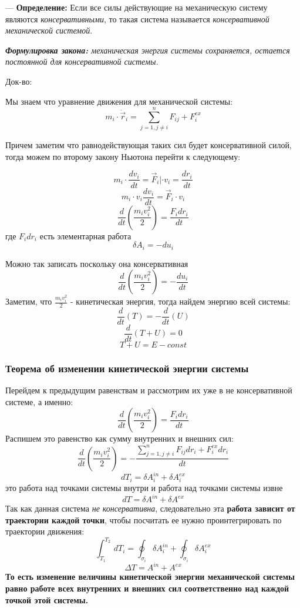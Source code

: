 \documentclass[12pt,a4paper]{report}
\begin{document}
\vspace{5px}

--- \textbf{Определение:} Если все силы действующие на механическую систему являются \textit{консервативными}, то такая система называется \textit{консервативной механической системой}.

\vspace{5px}

\textit{\textbf{Формулировка закона:} механическая энергия системы сохраняется, остается постоянной для консервативной системы.}

\vspace{5px}

Док-во:

Мы знаем что уравнение движения для механической системы:
\[ m_i \cdot \ddot \vec r_i = \sum_{j=1, j \neq i }^n F_{ij} + F_i^{ex} \]

Причем заметим что равнодействующая таких сил будет консервативной силой, тогда можем по второму закону Ньютона перейти к следующему:

\[ m_i \cdot \frac{dv_i}{dt} = \vec F_i | \cdot v_i = \frac{dr_i}{dt}\]
\[ m_i\cdot v_i \frac{dv_i}{dt} = \vec F_i \cdot v_i \]
\[\frac{d}{dt}(\frac{m_i v^2_i}{2}) = \frac{F_i dr_i}{dt}\]
где ${F_i dr_i}$ есть элементарная работа
\[ \delta A_i = -du_i\]

Можно так записать поскольку она консервативная
\[\frac{d}{dt}(\frac{m_i v^2_i}{2}) = -\frac{du_i}{dt}\]
Заметим, что $\frac{m_i v^2_i}{2}$ - кинетическая энергия, тогда найдем энергию всей системы:
\[\frac{d}{dt}(T) = -\frac{d}{dt}(U) \] \[ \frac{d}{dt}(T+U) = 0 \]
\[T+U = E - const\]

\vspace{7px}


\subsubsection{Теорема об изменении кинетической энергии системы}

Перейдем к предыдущим равенствам и рассмотрим их уже в не консервативной системе, а именно:
\[ \frac{d}{dt}(\frac{m_i v^2_i}{2}) = \frac{F_i dr_i}{dt}\]
Распишем это равенство как сумму внутренних и внешних сил:
\[ \frac{d}{dt}(\frac{m_i v^2_i}{2}) = -\frac{\sum_{j=1, j \neq i }^n F_{ij} dr_i + F_i^{ex}dr_i}{dt}\]
\[dT_i = \delta A_i^{in} + \delta A_i ^{ex}\]
это работа над точками системы внутри и работа над точками системы извне
\[dT = \delta A^{in} + \delta A^{ex}\]
Так как данная система \textit{не консервативна}, следовательно эта \textbf{работа зависит от траектории каждой точки}, чтобы посчитать ее нужно проинтегрировать по траектории движения:
\[ \int_{T_1}^{T_2} \,dT_i = \oint_{\sigma_i} \delta A_i^{in} + \oint_{\sigma_i} \delta A_i^{ex}\]
\[ \Delta T =  A^{in} + A^{ex}\]
\textbf{То есть изменение величины кинетической энергии механической системы равно работе всех внутренних и внешних сил соответственно над каждой точкой этой системы.}
\end{document}
